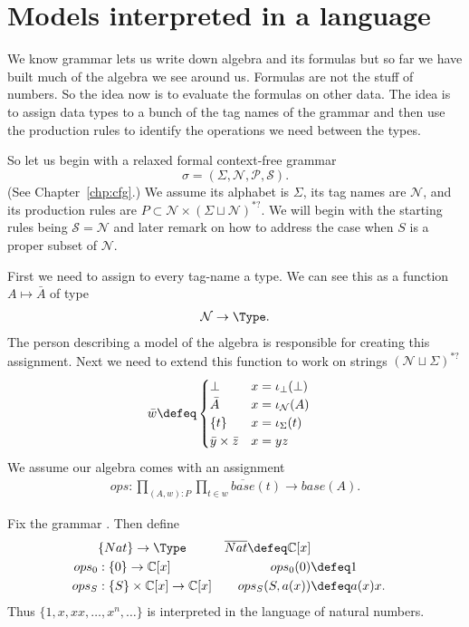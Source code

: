\section{Models interpreted in a language}
We know grammar lets us write down algebra and its formulas but so 
far we have built much of the algebra we see around us.  Formulas 
are not the stuff of numbers.  So the idea now is to evaluate the 
formulas on other data. The idea is to assign data types to a 
bunch of the tag names of the grammar and then use the production 
rules to identify the operations we need between the types.

So let us begin with a relaxed formal context-free grammar 
\[ 
    \sigma=(\Sigma,\mathcal{N},\mathcal{P},\mathcal{S}).
\] 
(See Chapter~\ref{chp:cfg}.)
We assume its alphabet is $\Sigma$, its tag names are $\mathcal{N}$, 
and its production rules are $P\subset \mathcal{N}\times (\Sigma\sqcup \mathcal{N})^{*?}$.
We will begin with the starting rules being $\mathcal{S}=\mathcal{N}$ and later remark on 
how to address the case when $S$ is a proper subset of $\mathcal{N}$.

First we need to assign to every tag-name a type.  We can see this 
as a function $A\mapsto \bar{A}$ of type
\begin{align*}
    \mathcal{N}\to \Type.
\end{align*}
The person describing a model of the algebra is responsible for 
creating this assignment.  Next we need to extend this function 
to work on strings $(\mathcal{N}\sqcup \Sigma)^{*?}$ 
\begin{align*}
    \bar{w} & \defeq \begin{cases}
        \bot & x=\iota_{\bot}(\bot)\\
        \bar{A} & x=\iota_{\mathcal{N}}(A)\\
        \{t\} & x=\iota_{\Sigma}(t)\\
        \bar{y}\times \bar{z} & x=yz
    \end{cases}
\end{align*}
We assume 
our algebra comes with an assignment
\begin{align*}
    ops:\prod_{(A,w):P}\prod_{t\in w}\overline{base}(t)\to base(A).
\end{align*}


\begin{example}
    Fix the grammar .
    Then define 
    \begin{align*}
        & \{Nat\}\to \Type & \overline{Nat} \defeq \mathbb{C}[x]\\
        ops_0 & : \{0\}\to \mathbb{C}[x] &  ops_0(0) & \defeq 1\\
        ops_S & : \{S\}\times \mathbb{C}[x]\to \mathbb{C}[x] &  ops_S(S,a(x)) & \defeq a(x)x.
    \end{align*}
    Thus $\{1,x,xx,\ldots, x^n,\ldots\}$ is interpreted in the language 
    of natural numbers.
\end{example}

